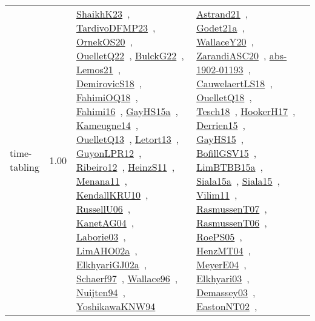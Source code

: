 {\begin{longtable}{p{3cm}r>{\raggedright\arraybackslash}p{6cm}>{\raggedright\arraybackslash}p{6cm}>{\raggedright\arraybackslash}p{8cm}}
\index{time-tabling}\index{Algorithms!time-tabling}time-tabling &  1.00 & \href{../works/ShaikhK23.pdf}{ShaikhK23}~\cite{ShaikhK23}, \href{../works/TardivoDFMP23.pdf}{TardivoDFMP23}~\cite{TardivoDFMP23}, \href{../works/OrnekOS20.pdf}{OrnekOS20}~\cite{OrnekOS20}, \href{../works/OuelletQ22.pdf}{OuelletQ22}~\cite{OuelletQ22}, \href{../works/BulckG22.pdf}{BulckG22}~\cite{BulckG22}, \href{../works/Lemos21.pdf}{Lemos21}~\cite{Lemos21}, \href{../works/DemirovicS18.pdf}{DemirovicS18}~\cite{DemirovicS18}, \href{../works/FahimiOQ18.pdf}{FahimiOQ18}~\cite{FahimiOQ18}, \href{../works/Fahimi16.pdf}{Fahimi16}~\cite{Fahimi16}, \href{../works/GayHS15a.pdf}{GayHS15a}~\cite{GayHS15a}, \href{../works/Kameugne14.pdf}{Kameugne14}~\cite{Kameugne14}, \href{../works/OuelletQ13.pdf}{OuelletQ13}~\cite{OuelletQ13}, \href{../works/Letort13.pdf}{Letort13}~\cite{Letort13}, \href{../works/GuyonLPR12.pdf}{GuyonLPR12}~\cite{GuyonLPR12}, \href{../works/Ribeiro12.pdf}{Ribeiro12}~\cite{Ribeiro12}, \href{../works/HeinzS11.pdf}{HeinzS11}~\cite{HeinzS11}, \href{../works/Menana11.pdf}{Menana11}~\cite{Menana11}, \href{../works/KendallKRU10.pdf}{KendallKRU10}~\cite{KendallKRU10}, \href{../works/RussellU06.pdf}{RussellU06}~\cite{RussellU06}, \href{../works/KanetAG04.pdf}{KanetAG04}~\cite{KanetAG04}, \href{../works/Laborie03.pdf}{Laborie03}~\cite{Laborie03}, \href{../works/LimAHO02a.pdf}{LimAHO02a}~\cite{LimAHO02a}, \href{../works/ElkhyariGJ02a.pdf}{ElkhyariGJ02a}~\cite{ElkhyariGJ02a}, \href{../works/Schaerf97.pdf}{Schaerf97}~\cite{Schaerf97}, \href{../works/Wallace96.pdf}{Wallace96}~\cite{Wallace96}, \href{../works/Nuijten94.pdf}{Nuijten94}~\cite{Nuijten94}, \href{../works/YoshikawaKNW94.pdf}{YoshikawaKNW94}~\cite{YoshikawaKNW94} & \href{../works/Astrand21.pdf}{Astrand21}~\cite{Astrand21}, \href{../works/Godet21a.pdf}{Godet21a}~\cite{Godet21a}, \href{../works/WallaceY20.pdf}{WallaceY20}~\cite{WallaceY20}, \href{../works/ZarandiASC20.pdf}{ZarandiASC20}~\cite{ZarandiASC20}, \href{../works/abs-1902-01193.pdf}{abs-1902-01193}~\cite{abs-1902-01193}, \href{../works/CauwelaertLS18.pdf}{CauwelaertLS18}~\cite{CauwelaertLS18}, \href{../works/OuelletQ18.pdf}{OuelletQ18}~\cite{OuelletQ18}, \href{../works/Tesch18.pdf}{Tesch18}~\cite{Tesch18}, \href{../works/HookerH17.pdf}{HookerH17}~\cite{HookerH17}, \href{../works/Derrien15.pdf}{Derrien15}~\cite{Derrien15}, \href{../works/GayHS15.pdf}{GayHS15}~\cite{GayHS15}, \href{../works/BofillGSV15.pdf}{BofillGSV15}~\cite{BofillGSV15}, \href{../works/LimBTBB15a.pdf}{LimBTBB15a}~\cite{LimBTBB15a}, \href{../works/Siala15a.pdf}{Siala15a}~\cite{Siala15a}, \href{../works/Siala15.pdf}{Siala15}~\cite{Siala15}, \href{../works/Vilim11.pdf}{Vilim11}~\cite{Vilim11}, \href{../works/RasmussenT07.pdf}{RasmussenT07}~\cite{RasmussenT07}, \href{../works/RasmussenT06.pdf}{RasmussenT06}~\cite{RasmussenT06}, \href{../works/RoePS05.pdf}{RoePS05}~\cite{RoePS05}, \href{../works/HenzMT04.pdf}{HenzMT04}~\cite{HenzMT04}, \href{../works/MeyerE04.pdf}{MeyerE04}~\cite{MeyerE04}, \href{../works/Elkhyari03.pdf}{Elkhyari03}~\cite{Elkhyari03}, \href{../works/Demassey03.pdf}{Demassey03}~\cite{Demassey03}, \href{../works/EastonNT02.pdf}{EastonNT02}~\cite{EastonNT02}, 
\end{longtable}}
